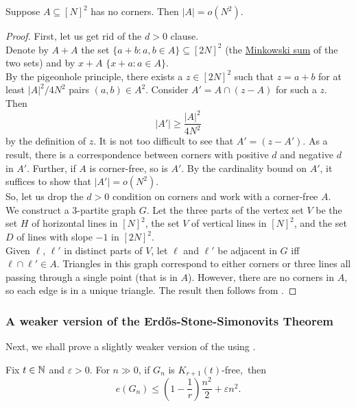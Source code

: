 			\begin{ftheo}
				\label{no corners theorem}
				Suppose $A\subseteq[N]^2$ has no corners. Then $|A| = o(N^2)$.
			\end{ftheo}
			\begin{proof}
				First, let us get rid of the $d>0$ clause.\\
				Denote by $A+A$ the set $\{a+b : a,b\in A\} \subseteq [2N]^2$ (the \href{https://en.wikipedia.org/wiki/Minkowski_addition}{Minkowski sum} of the two sets) and by $x+A$ $\{x+a : a\in A\}$.\\
				By the pigeonhole principle, there exists a $z\in[2N]^2$ such that $z=a+b$ for at least $|A|^2/4N^2$ pairs $(a,b)\in A^2$. Consider $A' = A \cap (z-A)$ for such a $z$. Then
				\[ |A'| \ge \frac{|A|^2}{4N^2} \]
				by the definition of $z$. It is not too difficult to see that $A' = (z - A')$. As a result, there is a correspondence between corners with positive $d$ and negative $d$ in $A'$. Further, if $A$ is corner-free, so is $A'$. By the cardinality bound on $A'$, it suffices to show that $|A'|=o(N^2)$.\\
				So, let us drop the $d > 0$ condition on corners and work with a corner-free $A$.\\

				We construct a $3$-partite graph $G$. Let the three parts of the vertex set $V$ be the set $H$ of horizontal lines in $[N]^2$, the set $V$ of vertical lines in $[N]^2$, and the set $D$ of lines with slope $-1$ in $[2N]^2$.\\
				Given $\ell$, $\ell'$ in distinct parts of $V$, let $\ell$ and $\ell'$ be adjacent in $G$ iff $\ell\cap\ell'\in A$. Triangles in this graph correspond to either corners or three lines all passing through a single point (that is in $A$). However, there are no corners in $A$, so each edge is in a unique triangle. The result then follows from .
			\end{proof}


		\subsubsection{A weaker version of the Erd\H{o}s-Stone-Simonovits Theorem}

			Next, we shall prove a slightly weaker version of the  using .

			\begin{ftheo}
				Fix $t\in\mathbb{N}$ and $\varepsilon>0$. For $n\gg 0$, if $G_n$ is $K_{r+1}(t)$-free,\footnotemark\ then
				\[ e(G_n) \le \left( 1 - \frac{1}{r} \right) \frac{n^2}{2} + \varepsilon n^2. \]
			\end{ftheo}


